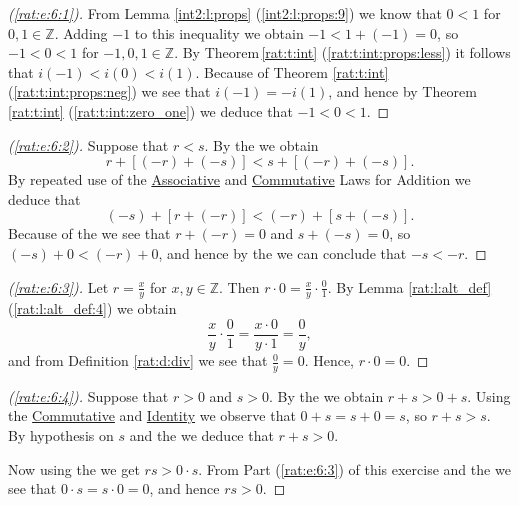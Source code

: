 \begin{proof}[(\ref{rat:e:6:1})]
	From Lemma \ref{int2:l:props} (\ref{int2:l:props:9}) we know that $0 < 1$ for $0,1 \in \mathbb{Z}$. Adding $-1$ to this inequality we obtain $-1 < 1 + (-1) = 0$, so $-1 < 0 < 1$ for $-1,0,1 \in \mathbb{Z}$. By Theorem\,\ref{rat:t:int} (\ref{rat:t:int:props:less}) it follows that $i(-1) < i(0) < i(1)$. Because of Theorem \ref{rat:t:int} (\ref{rat:t:int:props:neg}) we see that $i(-1) = -i(1)$, and hence by Theorem \ref{rat:t:int} (\ref{rat:t:int:zero_one}) we deduce that $-1 < 0 < 1$.
\end{proof}

\begin{proof}[(\ref{rat:e:6:2})]
	Suppose that $r < s$. By the  we obtain
	$$
		r + [(-r) + (-s)] < s + [(-r) + (-s)].
	$$
	By repeated use of the \hyperref[rat:t:props:associative_add]{Associative} and \hyperref[rat:t:props:commutative_add]{Commutative} Laws for Addition we deduce that
	$$
		(-s) + [r + (-r)] < (-r) + [s + (-s)].
	$$
	Because of the  we see that $r + (-r) = 0$ and $s + (-s) = 0$, so $(-s) + 0 < (-r) + 0$, and hence by the  we can conclude that $-s < -r$.
\end{proof}

\begin{proof}[(\ref{rat:e:6:3})]
	Let $r = \frac{x}{y}$ for $x,y \in \mathbb{Z}$. Then $r \cdot 0 = \frac{x}{y} \cdot \frac{0}{1}$. By Lemma \ref{rat:l:alt_def} (\ref{rat:l:alt_def:4}) we obtain
	$$
		\frac{x}{y} \cdot \frac{0}{1} = \frac{x \cdot 0}{y \cdot 1} = \frac{0}{y},
	$$
	and from Definition \ref{rat:d:div} we see that $\frac{0}{y} = 0$. Hence, $r \cdot 0 = 0$.

\end{proof}

\begin{proof}[(\ref{rat:e:6:4})]
	Suppose that $r > 0$ and $s > 0$. By the  we obtain $r + s > 0 + s$. Using the \hyperref[rat:t:props:commutative_add]{Commutative} and \hyperref[rat:t:props:identity_add]{Identity} we observe that $0 + s = s + 0 = s$, so $r + s > s$. By hypothesis on $s$ and the  we deduce that $r + s > 0$.

	Now using the  we get $rs > 0 \cdot s$. From Part (\ref{rat:e:6:3}) of this exercise and the  we see that $0 \cdot s = s \cdot 0 = 0$, and hence $rs > 0$.
\end{proof}

